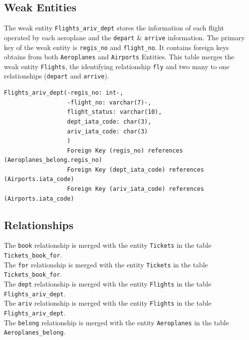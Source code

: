 \documentclass{article}
\begin{document}
	\subsection{Weak Entities}
	
	\noindent The weak entity \texttt{Flights\_ariv\_dept} stores the information of each flight operated by each aeroplane and the \texttt{depart} \& \texttt{arrive} information. The primary key of the weak entity is \texttt{regis\_no} and \texttt{flight\_no}. It contains foreign keys obtains from both \texttt{Aeroplanes} and \texttt{Airports} Entities. This table merges the weak entity \texttt{Flights}, the identifying relationship \texttt{fly} and two many to one relationships (\texttt{depart} and \texttt{arrive}). 
	\begin{lstlisting}[keepspaces=true]        
Flights_ariv_dept(-regis_no: int-, 
                  -flight_no: varchar(7)-,
                  flight_status: varchar(10),
                  dept_iata_code: char(3),
                  ariv_iata_code: char(3)
                  )
                  Foreign Key (regis_no) references (Aeroplanes_belong.regis_no)
                  Foreign Key (dept_iata_code) references (Airports.iata_code)
                  Foreign Key (ariv_iata_code) references (Airports.iata_code)
	\end{lstlisting}

	\subsection{Relationships}
	
	\noindent The \texttt{book} relationship is merged with the entity \texttt{Tickets} in the table \texttt{Tickets\_book\_for}. \\
	
	\noindent The \texttt{for} relationship is merged with the entity \texttt{Tickets} in the table \texttt{Tickets\_book\_for}. \\
	
	\noindent The \texttt{dept} relationship is merged with the entity \texttt{Flights} in the table \texttt{Flights\_ariv\_dept}. \\
	
	\noindent The \texttt{ariv} relationship is merged with the entity \texttt{Flights} in the table \texttt{Flights\_ariv\_dept}. \\
	
	\noindent The \texttt{belong} relationship is merged with the entity \texttt{Aeroplanes} in the table \texttt{Aeroplanes\_belong}. \\
	
\end{document}
